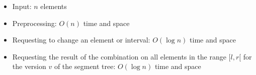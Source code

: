 \begin{itemize}
	\item Input: $n$ elements
	\item Preprocessing: $O(n)$ time and space
	\item Requesting to change an element or interval: $O(\log{n})$ time and space
	\item Requesting the result of the combination on all elements in the range $[l,r[$ for the version $v$ of the segment tree: $O(\log{n})$ time and space
\end{itemize}

